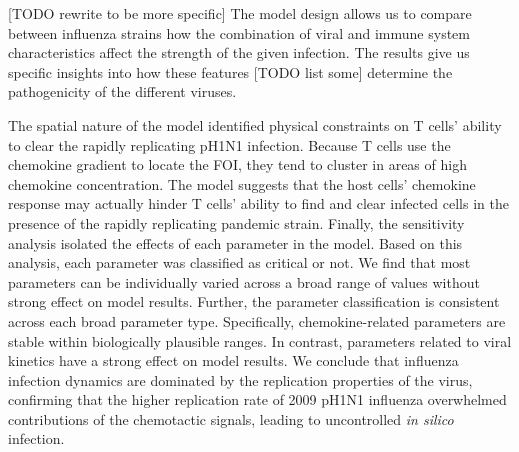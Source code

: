\documentclass[10pt]{article}
\begin{document}
[TODO rewrite to be more specific] The model design allows us to compare between influenza strains how the combination of viral and immune system characteristics affect the strength of the given infection.  The results give us specific insights into how these features [TODO list some] determine the pathogenicity of the different viruses.  

The spatial nature of the model identified physical constraints on T cells' ability to clear the rapidly replicating pH1N1 infection.  Because T cells use the chemokine gradient to locate the FOI, they tend to cluster in areas of high chemokine concentration.  The model suggests that the host cells' chemokine response may actually hinder T cells' ability to find and clear infected cells in the presence of the rapidly replicating pandemic strain.  Finally, the sensitivity analysis isolated the effects of each parameter in the model.  Based on this analysis, each parameter was classified as critical or not.  We find that most parameters can be individually varied across a broad range of values without strong effect on model results.  Further, the parameter classification is consistent across each broad parameter type. Specifically, chemokine-related parameters are stable within biologically plausible ranges.  In contrast, parameters related to viral kinetics have a strong effect on model results.  We conclude that influenza infection dynamics are dominated by the replication properties of the virus, confirming that the higher replication rate of 2009 pH1N1 influenza overwhelmed contributions of the chemotactic signals, leading to uncontrolled \textit{in silico} infection.





 


\end{document}
